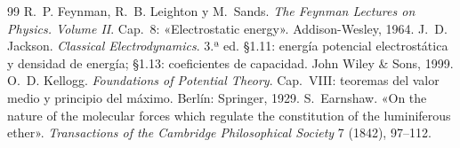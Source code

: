 \begin{thebibliography}{99}
 R.~P. Feynman, R.~B. Leighton y M.~Sands. \emph{The Feynman Lectures on Physics. Volume II}. Cap.~8: «Electrostatic energy». Addison-Wesley,
  1964.
 J.~D. Jackson. \emph{Classical Electrodynamics}. 3.ª ed. §1.11: energía potencial electrostática y densidad de energía; §1.13:
  coeficientes de capacidad. John Wiley \& Sons, 1999.
 O.~D. Kellogg. \emph{Foundations of Potential Theory}. Cap.~VIII: teoremas del valor medio y principio del máximo. Berlín: Springer, 1929.
 S.~Earnshaw. «On the nature of the molecular forces which regulate the constitution of the luminiferous ether». \emph{Transactions of the
  Cambridge Philosophical Society} 7 (1842), 97--112.
\end{thebibliography}
